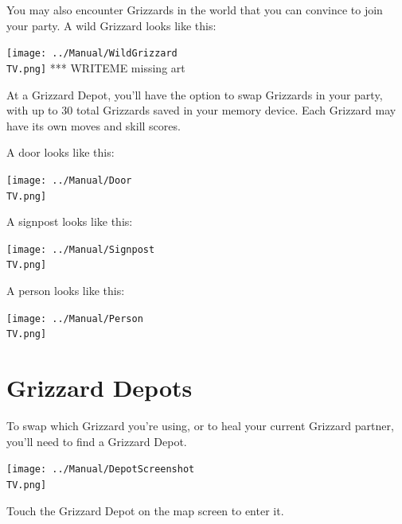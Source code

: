 \documentclass[10pt,twocolumn,openany,article]{memoir}
\newcommand\TV{NTSC}
\newcommand\TV{PAL}
\newcommand\TV{SECAM}
\begin{document}
You may also  encounter Grizzards in the world that  you can convince to
join your party. A wild Grizzard looks like this:

\begin{center}
  \texttt{[image: ../Manual/WildGrizzard\\TV.png]}
  *** WRITEME missing art
\end{center}

At a  Grizzard Depot, you'll have  the option to swap  Grizzards in your
party,  with up  to  30 total  Grizzards saved  in  your memory  device.
Each Grizzard may have its own moves and skill scores.

\fi

A door looks like this:

\begin{center}
  \texttt{[image: ../Manual/Door\\TV.png]}
\end{center}

A signpost looks like this:

\begin{center}
  \texttt{[image: ../Manual/Signpost\\TV.png]}
\end{center}

A person looks like this:

\begin{center}
  \texttt{[image: ../Manual/Person\\TV.png]}
\end{center}

\section{Grizzard Depots}

To \ifdefined\NOSAVE\else  swap which  Grizzard you're using,  or to  \fi heal
your current Grizzard partner, you'll need to find a Grizzard Depot.

\texttt{[image: ../Manual/DepotScreenshot\\TV.png]}

Touch the Grizzard Depot on the map screen to enter it.
\end{document}
